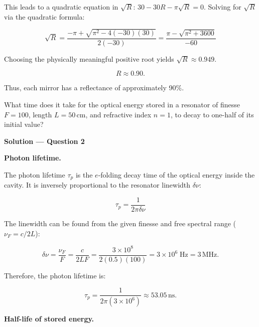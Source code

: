 This leads to a quadratic equation in $\sqrt{R}$:
$30 - 30R - \pi\sqrt{R} = 0$.
Solving for $\sqrt{R}$ via the quadratic formula:

\begin{equation*}
  \sqrt{R} = \frac{-\pi + \sqrt{\pi^2 - 4(-30)(30)}}{2(-30)} = \frac{\pi - \sqrt{\pi^2 + 3600}}{-60}
\end{equation*}

Choosing the physically meaningful positive root yields $\sqrt{R} \approx 0.949$.

\begin{equation*}
  \boxed{R \approx 0.90.}
\end{equation*}

Thus, each mirror has a reflectance of approximately 90\%.


\begin{question}[Question 2]What time does it take for the optical energy stored in a resonator of
finesse $F=100$, length $L=50$\,cm, and refractive index $n=1$, to decay to one-half of its
initial value?
\end{question}

\textbf{\large Solution --- Question 2}

\textbf{Photon lifetime.}

The photon lifetime $\tau_p$ is the $e$-folding decay time of the optical energy inside the cavity. It is inversely proportional to the resonator linewidth $\delta\nu$:

\begin{equation*}
  \tau_p = \frac{1}{2\pi\delta\nu}
\end{equation*}

The linewidth can be found from the given finesse and free spectral range ($\nu_F = c/2L$):

\begin{equation*}
  \delta\nu = \frac{\nu_F}{F} = \frac{c}{2LF} = \frac{3\times10^{8}}{2(0.5)(100)} = 3\times10^{6}\;\text{Hz} = 3\,\text{MHz}.
\end{equation*}

Therefore, the photon lifetime is:

\begin{equation*}
  \tau_p = \frac{1}{2\pi(3\times10^{6})} \approx 53.05\,\text{ns}.
\end{equation*}

\textbf{Half-life of stored energy.}

